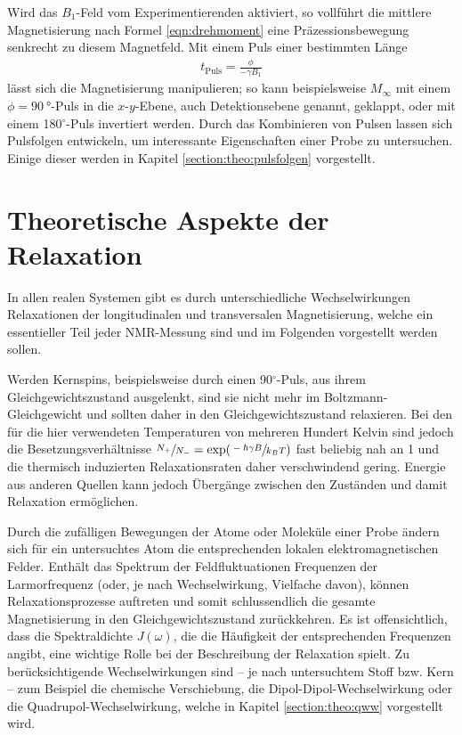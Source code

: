 Wird das $B_1$-Feld vom Experimentierenden aktiviert, so vollführt die mittlere Magnetisierung nach Formel \eqref{eqn:drehmoment} eine Präzessionsbewegung senkrecht zu diesem Magnetfeld. Mit einem Puls einer bestimmten Länge
\begin{align}
	t_\text{Puls} = \frac{\phi}{- \gamma B_1} \label{eqn:theo:pulslaenge}
\end{align}
lässt sich die Magnetisierung manipulieren; so kann beispielsweise $M_\infty$ mit einem $\phi = \SI{90}{\degree}$-Puls in die $x$-$y$-Ebene, auch Detektionsebene genannt, geklappt, oder mit einem 180$^\circ$-Puls invertiert werden. Durch das Kombinieren von Pulsen lassen sich Pulsfolgen entwickeln, um interessante Eigenschaften einer Probe zu untersuchen. Einige dieser werden in Kapitel \ref{section:theo:pulsfolgen} vorgestellt.



\section{Theoretische Aspekte der Relaxation} \label{section:theo:relax}

In allen realen Systemen gibt es durch unterschiedliche Wechselwirkungen Relaxationen der longitudinalen und transversalen Magnetisierung, welche ein essentieller Teil jeder NMR-Messung sind und im Folgenden vorgestellt werden sollen.

Werden Kernspins, beispielsweise durch einen 90$^\circ$-Puls, aus ihrem Gleichgewichtszustand ausgelenkt, sind sie nicht mehr im Boltzmann-Gleichgewicht und sollten daher in den Gleichgewichtszustand relaxieren. Bei den für die hier verwendeten Temperaturen von mehreren Hundert Kelvin sind jedoch die Besetzungsverhältnisse $\sfrac{N_+}{N_-} = \exp (\sfrac{- \hbar \gamma B}{k_B T})$ fast beliebig nah an 1 und die thermisch induzierten Relaxationsraten daher verschwindend gering. Energie aus anderen Quellen kann jedoch Übergänge zwischen den Zuständen und damit Relaxation ermöglichen.

Durch die zufälligen Bewegungen der Atome oder Moleküle einer Probe ändern sich für ein untersuchtes Atom die entsprechenden lokalen elektromagnetischen Felder. Enthält das Spektrum der Feldfluktuationen Frequenzen der Larmorfrequenz (oder, je nach Wechselwirkung, Vielfache davon), können Relaxationsprozesse auftreten und somit schlussendlich die gesamte Magnetisierung in den Gleichgewichtszustand zurückkehren. Es ist offensichtlich, dass die Spektraldichte $J(\omega)$, die die Häufigkeit der entsprechenden Frequenzen angibt, eine wichtige Rolle bei der Beschreibung der Relaxation spielt. Zu berücksichtigende Wechselwirkungen sind -- je nach untersuchtem Stoff bzw. Kern -- zum Beispiel die chemische Verschiebung, die Dipol-Dipol-Wechselwirkung oder die Quadrupol-Wechselwirkung, welche in Kapitel \ref{section:theo:qww} vorgestellt wird.


